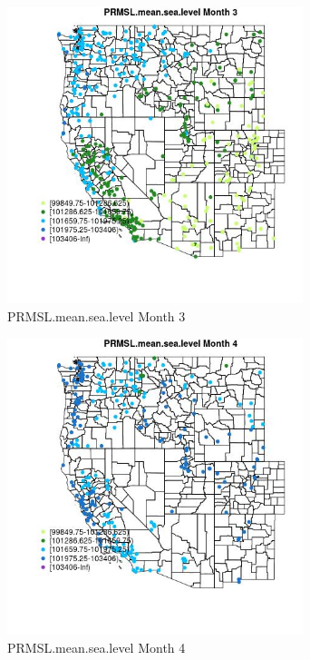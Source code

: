\begin{figure} 
\centering  
\includegraphics[width=0.77\textwidth]{Code_Outputs/Report_ML_input_PM25_Step4_part_e_de_duplicated_aveswNAs_MapObsMo3PRMSLmeansealevel.jpg} 
\caption{\label{fig:Report_ML_input_PM25_Step4_part_e_de_duplicated_aveswNAsMapObsMo3PRMSLmeansealevel}PRMSL.mean.sea.level Month 3} 
\end{figure} 
 

\begin{figure} 
\centering  
\includegraphics[width=0.77\textwidth]{Code_Outputs/Report_ML_input_PM25_Step4_part_e_de_duplicated_aveswNAs_MapObsMo4PRMSLmeansealevel.jpg} 
\caption{\label{fig:Report_ML_input_PM25_Step4_part_e_de_duplicated_aveswNAsMapObsMo4PRMSLmeansealevel}PRMSL.mean.sea.level Month 4} 
\end{figure} 
 

